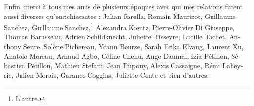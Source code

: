 \begin{otherlanguage}{french}
\begin{SingleSpace}
  Enfin, merci à tous mes amis de plusieurs époques avec qui mes relations
  furent aussi diverses qu'enrichissantes : Julian Farella, Romain
  Maurizot, Guillaume Sanchez, Guillaume Sanchez,\footnote{L'autre.} Alexandra
  Kientz, Pierre-Olivier Di Giuseppe, Thomas Barusseau, Adrien Schildknecht,
  Juliette Tisseyre, Lucille Tachet, Anthony Seure, Solène Pichereau, Yoann
  Bourse, Sarah Erika Elvang, Laurent Xu, Anatole Moreau, Arnaud Agbo, Céline
  Chenu, Ange Daumal, Izia Pétillon, Sébastien Pétillon, Mathieu Stefani, Jean
  Dupouy, Alexis Cassaigne, Rémi Labeyrie, Julien Morais, Garance Coggins,
  Juliette Conte et bien d'autres.

\end{SingleSpace}
\end{otherlanguage}
